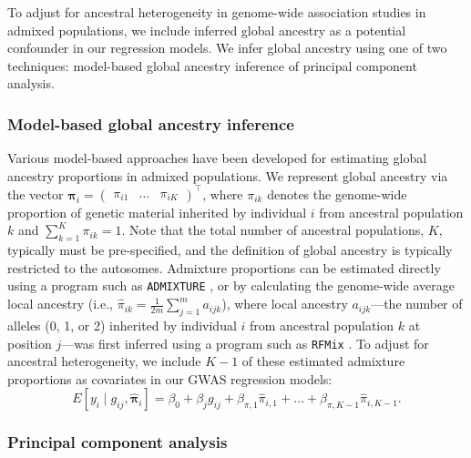 \documentclass[12pt]{article}
\newcommand{\edit}[1]{{\color{red}{#1}}}
\begin{document}
To adjust for ancestral heterogeneity in genome-wide association studies in admixed populations, we include inferred global ancestry as a potential confounder in our regression models. We infer global ancestry using one of two techniques: model-based global ancestry inference of principal component analysis.

\edit{Note: some of the following may be redundant with the Introduction section; consider trimming?}

\subsubsection{Model-based global ancestry inference}

Various model-based approaches have been developed for estimating global ancestry proportions in admixed populations.
We represent global ancestry via the vector $\boldsymbol{\pi}_i = \begin{pmatrix} \pi_{i1} & \dots & \pi_{iK} \end{pmatrix}^\top$, where $\pi_{ik}$ denotes the genome-wide proportion of genetic material inherited by individual $i$ from ancestral population $k$ and $\sum_{k=1}^K \pi_{ik} = 1$. 
Note that the total number of ancestral populations, $K$, typically must be pre-specified, and the definition of global ancestry is typically restricted to the autosomes.
Admixture proportions can be estimated directly using a program such as \texttt{ADMIXTURE} \citep{admixture}, or by calculating the genome-wide average local ancestry (i.e., $\hat\pi_{ik} = \frac{1}{2m} \sum_{j=1}^m a_{ijk}$), where local ancestry $a_{ijk}$---the number of alleles (0, 1, or 2) inherited by individual $i$ from ancestral population $k$ at position $j$---was first inferred using a program such as \texttt{RFMix} \citep{rfmix}.
To adjust for ancestral heterogeneity, we include $K-1$ of these estimated admixture proportions as covariates in our GWAS regression models: $$E[y_i \mid g_{ij}, \hat{\boldsymbol\pi}_i] = \beta_0 + \beta_j g_{ij} + \beta_{\pi, 1} \hat\pi_{i,1} + \dots + \beta_{\pi, K-1} \hat\pi_{i, K-1}.$$

\subsubsection{Principal component analysis}
\end{document}
